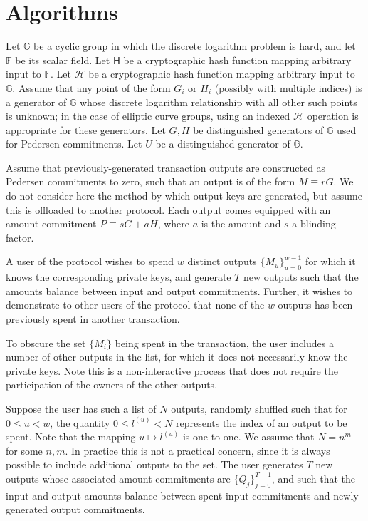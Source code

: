 \documentclass[draft]{article} %
\newcommand{\G}{\mathbb{G}}
\newcommand{\F}{\mathbb{F}}
\newcommand{\hs}{\mathsf{H}}
\newcommand{\hp}{\mathcal{H}}
\begin{document}
\section{Algorithms}
Let $\G$ be a cyclic group in which the discrete logarithm problem is hard, and let $\F$ be its scalar field.
Let $\hs$ be a cryptographic hash function mapping arbitrary input to $\F$.
Let $\hp$ be a cryptographic hash function mapping arbitrary input to $\G$.
Assume that any point of the form $G_i$ or $H_i$ (possibly with multiple indices) is a generator of $\G$ whose discrete logarithm relationship with all other such points is unknown; in the case of elliptic curve groups, using an indexed $\hp$ operation is appropriate for these generators.
Let $G, H$ be distinguished generators of $\G$ used for Pedersen commitments.
Let $U$ be a distinguished generator of $\G$.

Assume that previously-generated transaction outputs are constructed as Pedersen commitments to zero, such that an output is of the form $M \equiv rG$.
We do not consider here the method by which output keys are generated, but assume this is offloaded to another protocol.
Each output comes equipped with an amount commitment $P \equiv sG + aH$, where $a$ is the amount and $s$ a blinding factor.

A user of the protocol wishes to spend $w$ distinct outputs $\{M_u\}_{u=0}^{w-1}$ for which it knows the corresponding private keys, and generate $T$ new outputs such that the amounts balance between input and output commitments.
Further, it wishes to demonstrate to other users of the protocol that none of the $w$ outputs has been previously spent in another transaction.

To obscure the set $\{M_i\}$ being spent in the transaction, the user includes a number of other outputs in the list, for which it does not necessarily know the private keys.
Note this is a non-interactive process that does not require the participation of the owners of the other outputs.

Suppose the user has such a list of $N$ outputs, randomly shuffled such that for $0 \leq u < w$, the quantity $0 \leq l^{(u)} < N$ represents the index of an output to be spent.
Note that the mapping $u \mapsto l^{(u)}$ is one-to-one.
We assume that $N = n^m$ for some $n,m$.
In practice this is not a practical concern, since it is always possible to include additional outputs to the set.
The user generates $T$ new outputs whose associated amount commitments are $\{Q_j\}_{j=0}^{T-1}$, and such that the input and output amounts balance between spent input commitments and newly-generated output commitments.
\end{document}
